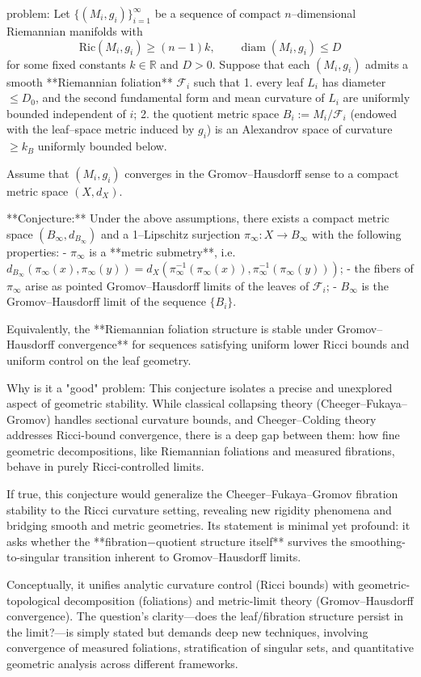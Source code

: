 problem:  
Let $\{(M_i, g_i)\}_{i=1}^\infty$ be a sequence of compact $n$–dimensional Riemannian manifolds with  
\[
\mathrm{Ric}(M_i,g_i) \geq (n-1)k, \qquad \operatorname{diam}(M_i,g_i) \leq D
\]
for some fixed constants $k \in \mathbb{R}$ and $D>0$.  
Suppose that each $(M_i,g_i)$ admits a smooth **Riemannian foliation** $\mathcal{F}_i$ such that  
1. every leaf $L_i$ has diameter $\leq D_0$, and the second fundamental form and mean curvature of $L_i$ are uniformly bounded independent of $i$;  
2. the quotient metric space $B_i := M_i/\mathcal{F}_i$ (endowed with the leaf–space metric induced by $g_i$) is an Alexandrov space of curvature $\geq k_B$ uniformly bounded below.

Assume that $(M_i,g_i)$ converges in the Gromov–Hausdorff sense to a compact metric space $(X,d_X)$.  

**Conjecture:**  
Under the above assumptions, there exists a compact metric space $(B_\infty, d_{B_\infty})$ and a 1–Lipschitz surjection $\pi_\infty : X \to B_\infty$ with the following properties:
- $\pi_\infty$ is a **metric submetry**, i.e. $d_{B_\infty}(\pi_\infty(x),\pi_\infty(y)) = d_X(\pi_\infty^{-1}(\pi_\infty(x)), \pi_\infty^{-1}(\pi_\infty(y)))$;
- the fibers of $\pi_\infty$ arise as pointed Gromov–Hausdorff limits of the leaves of $\mathcal{F}_i$;
- $B_\infty$ is the Gromov–Hausdorff limit of the sequence $\{B_i\}$.

Equivalently, the **Riemannian foliation structure is stable under Gromov–Hausdorff convergence** for sequences satisfying uniform lower Ricci bounds and uniform control on the leaf geometry.

Why is it a "good" problem:  
This conjecture isolates a precise and unexplored aspect of geometric stability. While classical collapsing theory (Cheeger–Fukaya–Gromov) handles sectional curvature bounds, and Cheeger–Colding theory addresses Ricci-bound convergence, there is a deep gap between them: how fine geometric decompositions, like Riemannian foliations and measured fibrations, behave in purely Ricci-controlled limits.  

If true, this conjecture would generalize the Cheeger–Fukaya–Gromov fibration stability to the Ricci curvature setting, revealing new rigidity phenomena and bridging smooth and metric geometries. Its statement is minimal yet profound: it asks whether the **fibration−quotient structure itself** survives the smoothing-to-singular transition inherent to Gromov–Hausdorff limits.  

Conceptually, it unifies analytic curvature control (Ricci bounds) with geometric-topological decomposition (foliations) and metric-limit theory (Gromov–Hausdorff convergence). The question’s clarity—does the leaf/fibration structure persist in the limit?—is simply stated but demands deep new techniques, involving convergence of measured foliations, stratification of singular sets, and quantitative geometric analysis across different frameworks.